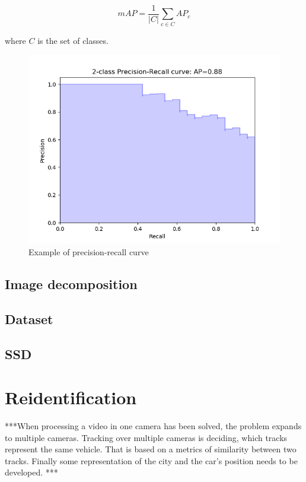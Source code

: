 \documentclass[a4paper,12pt,titlepage, twoside]{article}
\numberwithin{figure}{section}
\begin{document}
\begin{equation}
mAP = \frac{1}{|C|} \sum_{c \in C} AP_c
\end{equation}

where $C$ is the set of classes.

\begin{figure}[H]
\centering
\includegraphics[width=1\linewidth]{fig/precision-recall.png}
\caption{Example of precision-recall curve}
\label{fig:precision-recall}
\end{figure}







\subsection{Image decomposition}
\label{sec:decomposition}

\subsection{Dataset}
\label{sec:ssd-dataset}

\subsection{SSD}
\label{sec:ssd}

\section{Reidentification}


***When processing a video in one camera has been solved, the problem expands to multiple cameras. Tracking over multiple cameras is deciding, which tracks represent the same vehicle. That is based on a metrics of similarity between two tracks. Finally some representation of the city and the car's position needs to be developed.  ***
\end{document}
